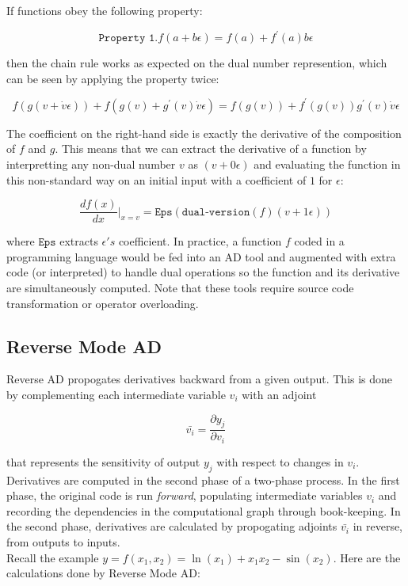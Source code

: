 \documentclass[11pt]{article}
\theoremstyle{definition}
\theoremstyle{plain}
\begin{document}
\noindent If functions obey the following property:

$$ \texttt{Property 1.} f(a + b \epsilon) = f(a) + f^\prime(a) b \epsilon$$

\noindent then the chain rule works as expected on the dual number represention, which
can be seen by applying the property twice:

$$ f(g(v + \dot{v}\epsilon)) + f(g(v) + g^\prime(v) \dot{v} \epsilon) =
f(g(v)) + f^\prime(g(v))g^\prime(v) \dot{v} \epsilon $$

\noindent The coefficient on the right-hand side is exactly the derivative of the
composition of $f$ and $g$. 
This means that we can extract the derivative of a function by interpretting
any non-dual number $v$ as $(v + 0 \epsilon)$ and evaluating the function
in this non-standard way on an initial input with a coefficient of $1$ for $\epsilon$:

$$ \frac{d f(x)}{dx} \rvert_{x=v} = \texttt{Eps}(\texttt{dual-version}(f)(v+1\epsilon)) $$

\noindent where $\texttt{Eps}$ extracts $\epsilon's$ coefficient.
In practice, a function $f$ coded in a programming language would be fed
into an AD tool and augmented with extra code (or interpreted) to handle
dual operations so the function and its derivative are simultaneously computed.
Note that these tools require source code transformation or operator overloading.

\subsection{Reverse Mode AD}

\noindent Reverse AD propogates derivatives backward from a given output. This
is done by complementing each intermediate variable $v_i$ with an adjoint

$$ \bar{v_i} = \frac{\partial y_j}{\partial v_i} $$

\noindent that represents the sensitivity of output $y_j$ with respect
to changes in $v_i$. Derivatives are computed in the second phase of a two-phase process.
In the first phase, the original code is run \textit{forward}, populating intermediate
variables $v_i$ and recording the dependencies in the computational graph through
book-keeping. In the second phase, derivatives are calculated by propogating adjoints
$\bar{v_i}$ in reverse, from outputs to inputs.\\

\noindent Recall the example $y = f(x_1,x_2) = \ln(x_1) + x_1 x_2 - \sin(x_2)$.
Here are the calculations done by Reverse Mode AD:
\end{document}

